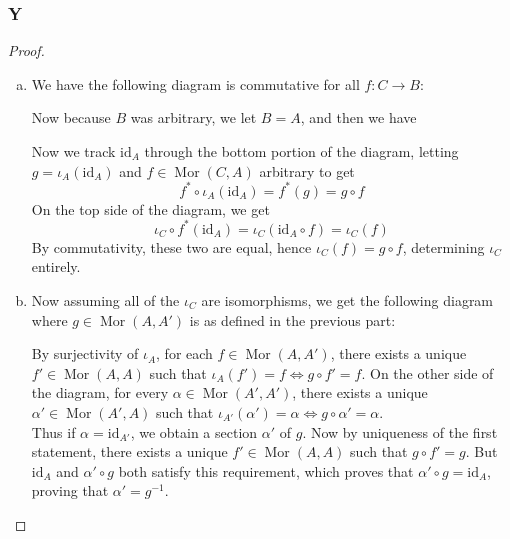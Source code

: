 \documentclass{article}
\newcommand{\id}{\mathrm{id}}
\DeclareMathOperator{\Mor}{Mor}
\begin{document}
\subsubsection{Y}\label{1.3.Y}
\begin{proof}
    \begin{enumerate}[(a)]
        \item We have the following diagram is commutative for all $f:C\to B$:
        \begin{center}
        \end{center}
        Now because $B$ was arbitrary, we let $B=A$, and then we have
        \begin{center}
        \end{center}
        Now we track $\id_A$ through the bottom portion of the diagram, letting $g=\iota_A(\id_A)$ and $f\in \Mor(C,A)$ arbitrary to get
        \[
        f^*\circ \iota_A(\id_A)=f^*(g)=g\circ f
        \]
        On the top side of the diagram, we get
    \[
    \iota_C\circ f^*(\id_A)=\iota_C(\id_A\circ f)=\iota_C(f)
    \]
    By commutativity, these two are equal, hence $\iota_C(f)=g\circ f$, determining $\iota_C$ entirely.
    \item 
    Now assuming all of the $\iota_C$ are isomorphisms, we get the following diagram where $g\in \Mor(A,A')$ is as defined in the previous part:
    \begin{center}
        \end{center}
        By surjectivity of $\iota_A$, for each $f\in \Mor(A,A')$, there exists a unique $f'\in \Mor(A,A)$ such that $\iota_A(f')=f\iff g\circ f'=f$. On the other side of the diagram, for every $\alpha\in \Mor(A',A')$, there exists a unique $\alpha'\in \Mor(A',A)$ such that $\iota_{A'}(\alpha')=\alpha \iff g\circ \alpha'=\alpha$.\\
        \newline
        Thus if $\alpha=\id_{A'}$, we obtain a section $\alpha'$ of $g$. Now by uniqueness of the first statement, there exists a unique $f'\in \Mor(A,A)$ such that $g\circ f'=g$. But $\id_A$ and $\alpha' \circ g$ both satisfy this requirement, which proves that $\alpha'\circ g=\id_A$, proving that $\alpha'=g^{-1}$.
    \end{enumerate}
    
\end{proof}
\end{document}
